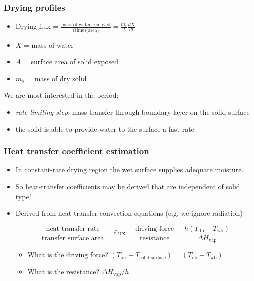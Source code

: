 \begin{frame}\frametitle{Drying profiles}	
	\begin{itemize}
		\item	Drying flux = $\displaystyle \frac{\text{mass of water removed}}{\text{(time)(area)}} = \displaystyle \frac{m_s}{A} \frac{dX}{dt}$
		\item	$X$ = mass of water
		\item	$A$ = surface area of solid exposed
		\item	$m_s$ = mass of dry solid
	\end{itemize}
	\vspace{12pt}
	We are most interested in the {\color{purple}{constant drying-rate}} period:
	\begin{itemize}
		\item	\emph{rate-limiting step}: mass transfer through boundary layer on the solid surface
		\item	the solid is able to provide water to the surface a fast rate
	\end{itemize}
\end{frame}

\begin{frame}\frametitle{Heat transfer coefficient estimation}
	\begin{itemize}
		\item	In constant-rate drying region the wet surface supplies adequate moisture.
		\item	So heat-transfer coefficients may be derived that are independent of solid type!
		\item	Derived from heat transfer convection equations (e.g. we ignore radiation)
		
		\begin{exampleblock}{}
			\[
				\displaystyle \frac{\text{heat transfer rate}}{\text{transfer surface area}}  = \text{flux} = \displaystyle \frac{\text{driving force}}{\text{resistance}} = \frac{h (T_\text{db} - T_\text{wb})}{\Delta H_\text{vap}}
			\]
		\end{exampleblock}
		\begin{itemize}
			\item	What is the driving force? $(T_\text{air} - T_\text{solid surface}) = (T_\text{db} - T_\text{wb})$
			\item	What is the resistance? $\Delta H_\text{vap} / h$
		\end{itemize}
	\end{itemize}
\end{frame}

